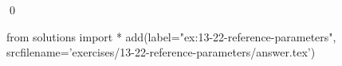 
\begin{ex}
  \label{ex:13-22-reference-parameters}
  
  \qed
\end{ex}
\begin{python0}
from solutions import *
add(label="ex:13-22-reference-parameters",
    srcfilename='exercises/13-22-reference-parameters/answer.tex')
\end{python0}
